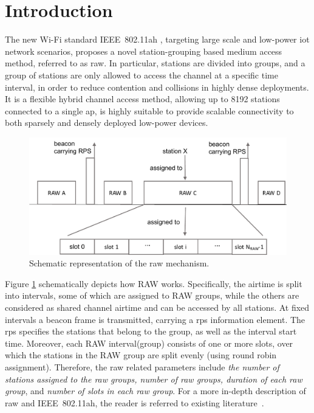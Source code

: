 \section{Introduction}

The new Wi-Fi standard IEEE~802.11ah \cite{80211ahStd}, targeting large scale and low-power \gls{iot} network scenarios, proposes a novel station-grouping based medium access method, referred to as \gls{raw}. In particular, stations are divided into groups, and a group of stations are only allowed to access the channel at a specific time interval, in order to reduce contention and collisions in highly dense deployments. It is a flexible hybrid channel access method, allowing up to 8192 stations connected to a single \gls{ap}, is highly suitable to provide scalable connectivity to both sparsely and densely deployed low-power devices. 


\begin{figure}[t]
  \centering
  \includegraphics[width=0.8\columnwidth]{figures/raw}
  \caption{Schematic representation of the \gls{raw} mechanism.\label{fig:RAW}}
\end{figure}


Figure \ref{fig:RAW} schematically depicts how RAW works. Specifically, the airtime is split into intervals, some of which are assigned to RAW groups, while the others are considered as shared channel airtime and can be accessed by all stations. At fixed intervals a beacon frame is transmitted,
carrying a \gls{rps} information element. The \gls{rps} specifies the stations that belong to the group, as
well as the interval start time. Moreover, each RAW interval(group) consists of one or more slots, over which the stations in the RAW group are split evenly (using round robin assignment). Therefore, the \gls{raw} related parameters include \textit{ the number of stations assigned to the \gls{raw} groups, number of \gls{raw} groups, duration of each \gls{raw} group}, and  \textit{number of slots in each \gls{raw} group}. For a more in-depth description of \gls{raw} and IEEE~802.11ah, the reader is referred to existing literature~\cite{80211ahStd, Khorov2015a, sensors80211ah}.

